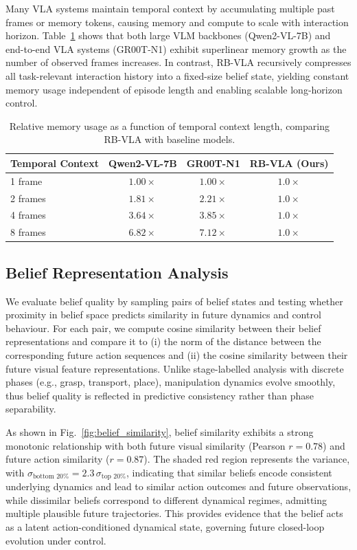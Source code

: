 \documentclass[12pt]{article}
\begin{document}
Many VLA systems maintain temporal context by accumulating multiple past frames or memory tokens, causing memory and compute to scale with interaction horizon. Table~\ref{tab:memory_scaling} shows that both large VLM backbones (Qwen2-VL-7B) and end-to-end VLA systems (GR00T-N1) exhibit superlinear memory growth as the number of observed frames increases. In contrast, RB-VLA recursively compresses all task-relevant interaction history into a fixed-size belief state, yielding constant memory usage independent of episode length and enabling scalable long-horizon control.

\begin{table}[h]
\centering
\renewcommand{\arraystretch}{1.2}
\caption{Relative memory usage as a function of temporal context length, comparing RB-VLA with baseline models.}
\label{tab:memory_scaling}
\begin{tabular}{lccc}
\toprule
\textbf{Temporal Context} & \textbf{Qwen2-VL-7B} & \textbf{GR00T-N1} & \textbf{RB-VLA (Ours)} \\
\midrule
1 frame  & $1.00\times$  & $1.00\times$  & $1.0\times$ \\
2 frames  & $1.81\times$ & $2.21\times$  & $1.0\times$ \\
4 frames  & $3.64\times$ & $3.85\times$ & $1.0\times$ \\
8 frames  & $6.82\times$  & $7.12\times$  & $1.0\times$ \\
\bottomrule
\end{tabular}
\end{table}

\subsection{Belief Representation Analysis}
We evaluate belief quality by sampling pairs of belief states and testing whether proximity in belief space predicts similarity in future dynamics and control behaviour. For each pair, we compute cosine similarity between their belief representations and compare it to (i) the norm of the distance between the corresponding future action sequences and (ii) the cosine similarity between their future visual feature representations. Unlike stage-labelled analysis with discrete phases (e.g., grasp, transport, place), manipulation dynamics evolve smoothly, thus belief quality is reflected in predictive consistency rather than phase separability.

As shown in Fig.~\ref{fig:belief_similarity}, belief similarity exhibits a strong monotonic relationship with both future visual similarity (Pearson $r=0.78$) and future action similarity ($r=0.87$). The shaded red region represents the variance, with $\sigma_{\text{bottom }20\%} = 2.3\,\sigma_{\text{top }20\%}$, indicating that similar beliefs encode consistent underlying dynamics and lead to similar action outcomes and future observations, while dissimilar beliefs correspond to different dynamical regimes, admitting multiple plausible future trajectories. This provides evidence that the belief acts as a latent action-conditioned dynamical state, governing future closed-loop evolution under control.
\end{document}
